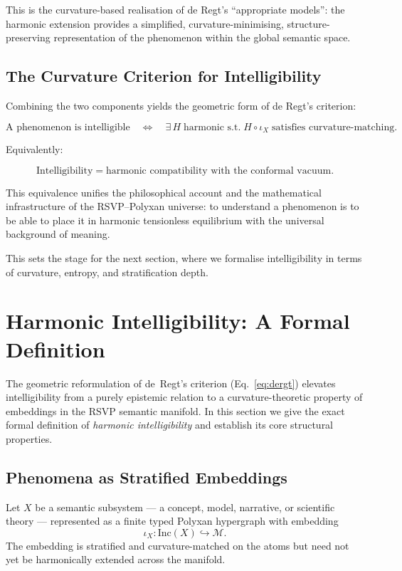 This is the curvature-based realisation of de Regt’s “appropriate models”:
the harmonic extension provides a simplified, curvature-minimising,
structure-preserving representation of the phenomenon within the global
semantic space.

\bigskip

\subsection*{The Curvature Criterion for Intelligibility}

Combining the two components yields the geometric form of de Regt’s criterion:

\begin{equation}
\label{eq:dergt}
\text{A phenomenon is intelligible}
\quad\Longleftrightarrow\quad
\exists\, H\;\text{harmonic s.t.}\; H\circ\iota_X\;\text{satisfies curvature-matching.}
\end{equation}

Equivalently:

\[
\text{Intelligibility}
=
\text{harmonic compatibility with the conformal vacuum}.
\]

This equivalence unifies the philosophical account and the mathematical
infrastructure of the RSVP--Polyxan universe:  
to understand a phenomenon is to be able to place it in harmonic tensionless
equilibrium with the universal background of meaning.

This sets the stage for the next section, where we formalise intelligibility
in terms of curvature, entropy, and stratification depth.

\section{Harmonic Intelligibility: A Formal Definition}

The geometric reformulation of de~Regt’s criterion (Eq.~\ref{eq:dergt}) elevates
intelligibility from a purely epistemic relation to a curvature-theoretic
property of embeddings in the RSVP semantic manifold.  
In this section we give the exact formal definition of \emph{harmonic
intelligibility} and establish its core structural properties.

\subsection*{Phenomena as Stratified Embeddings}

Let $X$ be a semantic subsystem — a concept, model, narrative, or scientific
theory — represented as a finite typed Polyxan hypergraph with embedding
\[
\iota_X : \mathrm{Inc}(X) \hookrightarrow \mathcal{M}.
\]
The embedding is stratified and curvature-matched on the atoms but need not
yet be harmonically extended across the manifold.

